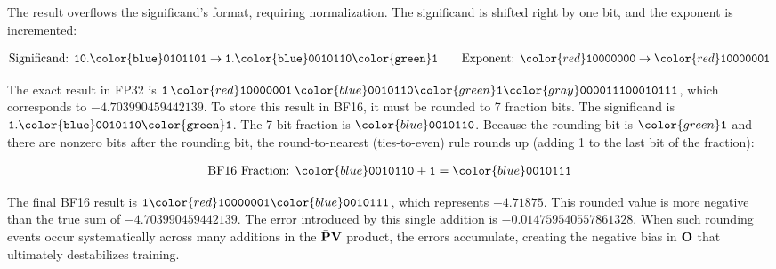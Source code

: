 \documentclass{article} %
\begin{document}
The result overflows the significand's format, requiring normalization. The significand is shifted right by one bit, and the exponent is incremented:
\begin{tcolorbox}[colback=black!5!white,      
  colframe=black,             
  boxrule=0.5pt,             
  width=0.95\linewidth,       
  arc=4pt,                     
  boxsep=1pt,                  
  halign=center,              
  top=0pt,
  bottom=0.5pt,
  center]
\vspace{-4px}
\begin{align*}
  \text{Significand: } \mathtt{10.{\color{blue}0101101}} \to \mathtt{1.{\color{blue}0010110}{\color{green}1}} \quad \quad
  \text{Exponent: } {\color{red}\mathtt{10000000}} \to {\color{red}\mathtt{10000001}}
\end{align*}
\end{tcolorbox}
The exact result in FP32 is $\mathtt{1}\,{\color{red}\mathtt{10000001}}\,{\color{blue}\mathtt{0010110}}{\color{green}\mathtt{1}}{\color{gray}\mathtt{000011100010111}}$, which corresponds to $-4.703990459442139$. To store this result in BF16, it must be rounded to 7 fraction bits. The significand is $\mathtt{1.{\color{blue}0010110}{\color{green}1}}$. The 7-bit fraction is ${\color{blue}\mathtt{0010110}}$. Because the rounding bit is ${\color{green}\mathtt{1}}$ and there are nonzero bits after the rounding bit, the round-to-nearest (ties-to-even) rule rounds up (adding 1 to the last bit of the fraction):
\begin{tcolorbox}[colback=black!5!white,      
  colframe=black,             
  boxrule=0.5pt,             
  width=0.95\linewidth,       
  arc=4pt,                     
  boxsep=1pt,                  
  halign=center,              
  top=0pt,
  bottom=0.5pt,
  center]
\vspace{-4px}
  \begin{align*}
  \text{BF16 Fraction: } {\color{blue}\mathtt{0010110}} + \mathtt{1} = {\color{blue}\mathtt{0010111}}
\end{align*}
\end{tcolorbox}
The final BF16 result is $\mathtt{1}{\color{red}\mathtt{10000001}}{\color{blue}\mathtt{0010111}}$, which represents $-4.71875$. This rounded value is more negative than the true sum of $-4.703990459442139$. The error introduced by this single addition is $\mathbf{-0.014759540557861328}$. When such rounding events occur systematically across many additions in the $\bar{{\mathbf{P}}}{\mathbf{V}}$ product, the errors accumulate, creating the negative bias in ${\mathbf{O}}$ that ultimately destabilizes training.
\end{document}
